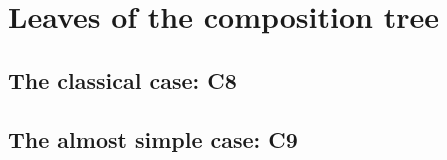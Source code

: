 
\chapter{Leaves of the composition tree}
\label{chap:leaves}

\section{The classical case: C8}
\label{solveC8}

\section{The almost simple case: C9}
\label{solveC9}

